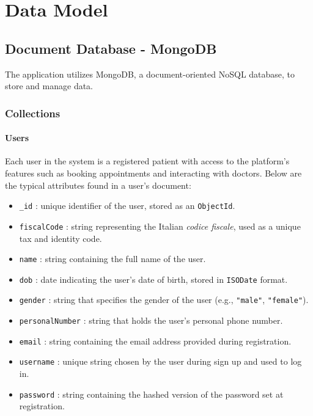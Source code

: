 \chapter{Data Model}

\section{Document Database - MongoDB}
The application utilizes MongoDB, a document-oriented NoSQL database, to store and manage data.

\subsection{Collections}

\subsubsection{Users}
Each user in the system is a registered patient with access to the platform’s features such as booking appointments and interacting with doctors. Below are the typical attributes found in a user’s document:

\begin{itemize}
    \item \texttt{\_id} : unique identifier of the user, stored as an \texttt{ObjectId}.
    \item \texttt{fiscalCode} : string representing the Italian \textit{codice fiscale}, used as a unique tax and identity code.
    \item \texttt{name} : string containing the full name of the user.
    \item \texttt{dob} : date indicating the user’s date of birth, stored in \texttt{ISODate} format.
    \item \texttt{gender} : string that specifies the gender of the user (e.g., \texttt{"male"}, \texttt{"female"}).
    \item \texttt{personalNumber} : string that holds the user’s personal phone number.
    \item \texttt{email} : string containing the email address provided during registration.
    \item \texttt{username} : unique string chosen by the user during sign up and used to log in.
    \item \texttt{password} : string containing the hashed version of the password set at registration.
\end{itemize}

